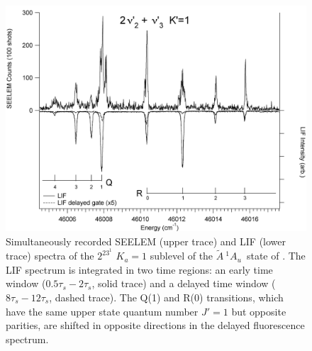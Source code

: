 \documentclass[12pt]{mitthesis}
\newcommand{\astate}{$
  \tilde{A} \: ^1\!A_u
  $}
\newcommand{\Ka}[1]{$K_a\!\!=\!#1$}
\begin{document}


\begin{figure}
  \caption{Simultaneously recorded SEELEM (upper trace) and LIF (lower
    trace) spectra of the $2^23^1$ \Ka{1} sublevel of the \astate\
    state of .  The LIF spectrum is integrated in two time
    regions: an early time window ($0.5\tau_s-2\tau_s$, solid trace)
    and a delayed time window ($8\tau_s-12\tau_s$, dashed trace).  The
    Q(1) and R(0) transitions, which have the same upper state quantum
    number $J'=1$ but opposite parities, are shifted in opposite
    directions in the delayed fluorescence spectrum.}
  \label{fig:spectrum-2231}
  \centering
  \vspace{1cm}
  \includegraphics[width=7in,angle=90]{acetylene-2231-q4r3.png}
\end{figure}
\end{document}
